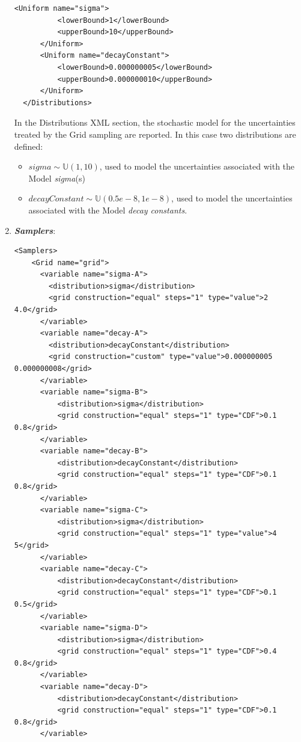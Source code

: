 \begin{enumerate}
\begin{lstlisting}[style=XML,morekeywords={arg,extension,pauseAtEnd,overwrite}]
      <Uniform name="sigma">
          <lowerBound>1</lowerBound>
          <upperBound>10</upperBound>
      </Uniform>
      <Uniform name="decayConstant">
          <lowerBound>0.000000005</lowerBound>
          <upperBound>0.000000010</upperBound>
      </Uniform>
  </Distributions>   
\end{lstlisting}
  In the Distributions XML section, the stochastic model for the 
  uncertainties  treated by the Grid sampling are reported. In 
  this case two distributions are defined: 
  \begin{itemize}
    \item $sigma \sim \mathbb{U}(1,10)$, used to model the uncertainties 
    associated with  the Model \textit{sigma}(s)
    \item  $decayConstant \sim \mathbb{U}(0.5e-8,1e-8)$,  used to 
    model the uncertainties 
    associated with  the Model \textit{decay constants}.
  \end{itemize}
   \item \textbf{\textit{Samplers}}:
\begin{lstlisting}[style=XML,morekeywords={arg,extension,pauseAtEnd,overwrite}]
  <Samplers>
    <Grid name="grid">
      <variable name="sigma-A">
        <distribution>sigma</distribution>
        <grid construction="equal" steps="1" type="value">2 4.0</grid>
      </variable>
      <variable name="decay-A">
        <distribution>decayConstant</distribution>
        <grid construction="custom" type="value">0.000000005  0.000000008</grid>
      </variable>
      <variable name="sigma-B">
          <distribution>sigma</distribution>
          <grid construction="equal" steps="1" type="CDF">0.1 0.8</grid>
      </variable>
      <variable name="decay-B">
          <distribution>decayConstant</distribution>
          <grid construction="equal" steps="1" type="CDF">0.1 0.8</grid>
      </variable>
      <variable name="sigma-C">
          <distribution>sigma</distribution>
          <grid construction="equal" steps="1" type="value">4 5</grid>
      </variable>
      <variable name="decay-C">
          <distribution>decayConstant</distribution>
          <grid construction="equal" steps="1" type="CDF">0.1 0.5</grid>
      </variable>
      <variable name="sigma-D">
          <distribution>sigma</distribution>
          <grid construction="equal" steps="1" type="CDF">0.4 0.8</grid>
      </variable>
      <variable name="decay-D">
          <distribution>decayConstant</distribution>
          <grid construction="equal" steps="1" type="CDF">0.1 0.8</grid>
      </variable>

\end{lstlisting}
\end{enumerate}
